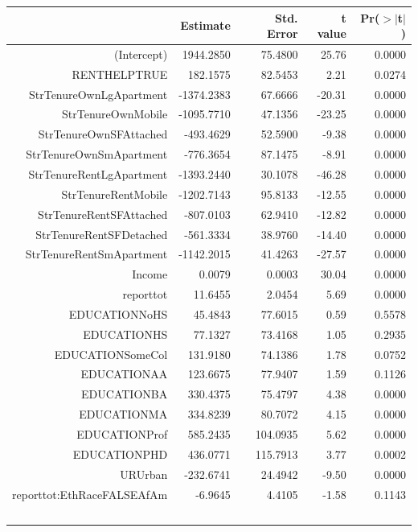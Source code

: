 \documentclass{article}
\begin{document}
\begin{table}[ht]
\centering
\begin{tabular}{rrrrr}
  \hline
 & Estimate & Std. Error & t value & Pr($>$$|$t$|$) \\ 
  \hline
(Intercept) & 1944.2850 & 75.4800 & 25.76 & 0.0000 \\ 
  RENTHELPTRUE & 182.1575 & 82.5453 & 2.21 & 0.0274 \\ 
  StrTenureOwnLgApartment & -1374.2383 & 67.6666 & -20.31 & 0.0000 \\ 
  StrTenureOwnMobile & -1095.7710 & 47.1356 & -23.25 & 0.0000 \\ 
  StrTenureOwnSFAttached & -493.4629 & 52.5900 & -9.38 & 0.0000 \\ 
  StrTenureOwnSmApartment & -776.3654 & 87.1475 & -8.91 & 0.0000 \\ 
  StrTenureRentLgApartment & -1393.2440 & 30.1078 & -46.28 & 0.0000 \\ 
  StrTenureRentMobile & -1202.7143 & 95.8133 & -12.55 & 0.0000 \\ 
  StrTenureRentSFAttached & -807.0103 & 62.9410 & -12.82 & 0.0000 \\ 
  StrTenureRentSFDetached & -561.3334 & 38.9760 & -14.40 & 0.0000 \\ 
  StrTenureRentSmApartment & -1142.2015 & 41.4263 & -27.57 & 0.0000 \\ 
  Income & 0.0079 & 0.0003 & 30.04 & 0.0000 \\ 
  reporttot & 11.6455 & 2.0454 & 5.69 & 0.0000 \\ 
  EDUCATIONNoHS & 45.4843 & 77.6015 & 0.59 & 0.5578 \\ 
  EDUCATIONHS & 77.1327 & 73.4168 & 1.05 & 0.2935 \\ 
  EDUCATIONSomeCol & 131.9180 & 74.1386 & 1.78 & 0.0752 \\ 
  EDUCATIONAA & 123.6675 & 77.9407 & 1.59 & 0.1126 \\ 
  EDUCATIONBA & 330.4375 & 75.4797 & 4.38 & 0.0000 \\ 
  EDUCATIONMA & 334.8239 & 80.7072 & 4.15 & 0.0000 \\ 
  EDUCATIONProf & 585.2435 & 104.0935 & 5.62 & 0.0000 \\ 
  EDUCATIONPHD & 436.0771 & 115.7913 & 3.77 & 0.0002 \\ 
  URUrban & -232.6741 & 24.4942 & -9.50 & 0.0000 \\ 
  reporttot:EthRaceFALSEAfAm & -6.9645 & 4.4105 & -1.58 & 0.1143 \\ 
$$
\end{tabular}
\end{table}
\end{document}
